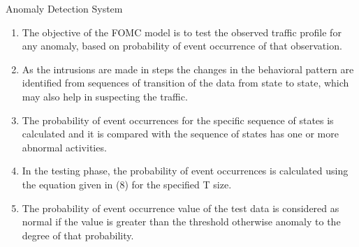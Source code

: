 \documentclass{beamer}
\begin{document}
\begin{frame}{Anomaly Detection System}
\begin{enumerate}
    \item The objective of the FOMC model is to test the observed traffic profile for any anomaly, based on probability of event occurrence of that observation.
    \item As the intrusions are made in steps the changes in the behavioral pattern are identified from sequences of transition of the data from state to state, which may also help in suspecting the traffic. 
    \item The probability of event occurrences for the specific sequence of states is calculated and it is compared with the sequence of states has one or more abnormal activities. 
    \item In the testing phase, the probability of event occurrences is calculated using the equation given in (8) for the specified T size.
    \item The probability of event occurrence value of the test data is considered as normal if the value is greater than the threshold otherwise anomaly to the degree of that probability.
\end{enumerate}
\end{frame}
\end{document}
